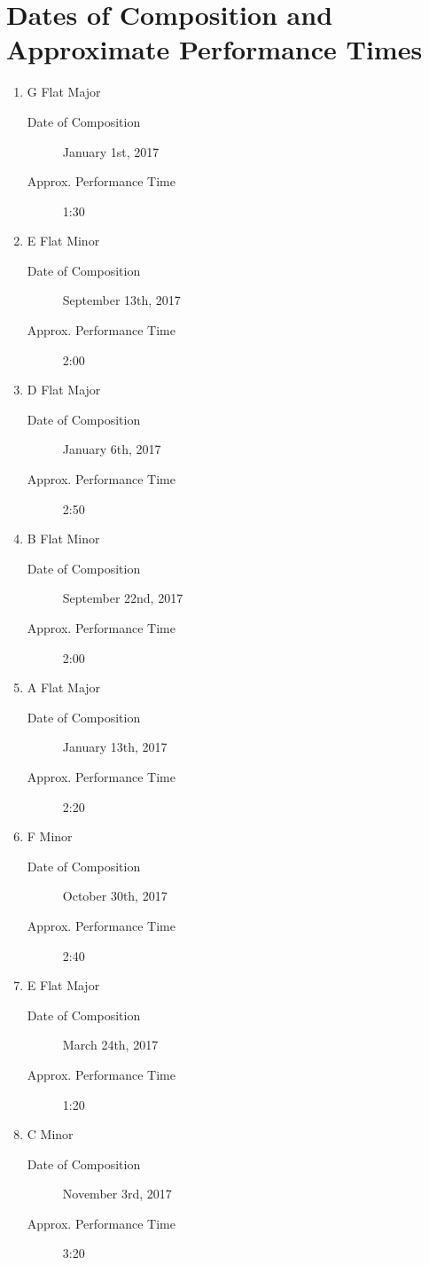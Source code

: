 \documentclass{jarticle}
\begin{document}
\section*{Dates of Composition and Approximate Performance Times}
\begin{enumerate}
\item G Flat Major
	\begin{description}
	\item[Date of Composition] January 1st, 2017
	\item[Approx. Performance Time] 1:30
	\end{description}
\item E Flat Minor
	\begin{description}
	\item[Date of Composition] September 13th, 2017
	\item[Approx. Performance Time] 2:00
	\end{description}

\item D Flat Major
	\begin{description}
	\item[Date of Composition] January 6th, 2017
	\item[Approx. Performance Time] 2:50
	\end{description}
\item B Flat Minor
	\begin{description}
	\item[Date of Composition] September 22nd, 2017
	\item[Approx. Performance Time] 2:00
	\end{description}

\item A Flat Major
	\begin{description}
	\item[Date of Composition] January 13th, 2017
	\item[Approx. Performance Time] 2:20
	\end{description}
\item F Minor
	\begin{description}
	\item[Date of Composition] October 30th, 2017
	\item[Approx. Performance Time] 2:40
	\end{description}
	
\item E Flat Major
	\begin{description}
	\item[Date of Composition] March 24th, 2017
	\item[Approx. Performance Time] 1:20
	\end{description}
\item C Minor
	\begin{description}
	\item[Date of Composition] November 3rd, 2017
	\item[Approx. Performance Time] 3:20
	\end{description}


\end{enumerate}
\end{document}
